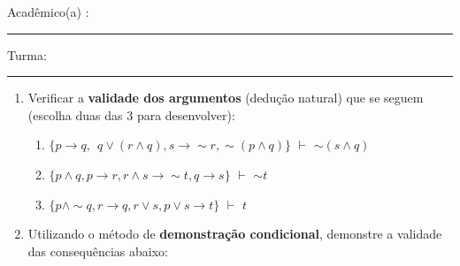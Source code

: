 \documentclass[12pt, a4paper,final]{article}
\begin{document}


\vskip 0.5cm Acad\^emico(a) : \rule{10cm}{0.4pt} Turma:  \rule{1cm}{0.4pt}
\noindent
\begin{enumerate}

\item Verificar a \textbf{validade dos argumentos} (dedu\c c\~ao natural) que se seguem (escolha duas das 3 para desenvolver):

\begin{enumerate}
\setlength{\itemsep}{-1pt} 

\item $\{ p \rightarrow q, \:\: q \vee (r \wedge q), s \rightarrow \sim r, \sim (p \wedge q) \}$ {\bf $\vdash $} $\sim (s \wedge q)$

\item $\{ p \wedge q, p \rightarrow r,  r \wedge s \rightarrow \sim t,  q \rightarrow s   \}$ {\bf $\vdash $} $\sim t$

\item $\{ p \wedge \sim q, r \rightarrow q,  r \vee s,  p \vee s \rightarrow t   \}$ {\bf $\vdash $} $ t $

\begin{comment}
 \item $\{ p \rightarrow q, q \rightarrow (p \rightarrow (r \vee s)), r \leftrightarrow s, \sim (r \wedge s) \}$ {\bf $\vdash $} $\sim p$

\item $\{ \sim p \vee q, \sim q, \sim (q \wedge r) \rightarrow p \}$  {\bf $\vdash $} $r$

\item $\{\sim (p \wedge q), \sim q \rightarrow r, \sim p \rightarrow r, s \rightarrow\sim r \}$  {\bf $\vdash $} $\sim s$
\end{comment}

\end{enumerate}


 \item Utilizando o m\'etodo de {\bf demonstra\c c\~ao condicional}, demonstre a validade das consequ\^encias abaixo:
  

\end{enumerate}
\end{document}
